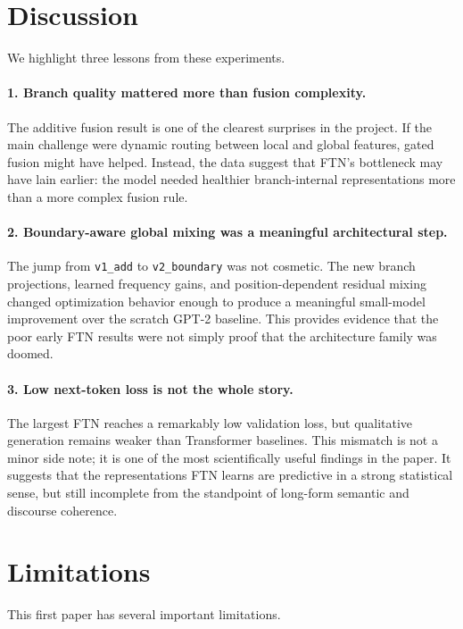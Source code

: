 \documentclass[11pt]{article}
\begin{document}
\section{Discussion}
\label{sec:discussion}
We highlight three lessons from these experiments.

\paragraph{1. Branch quality mattered more than fusion complexity.}
The additive fusion result is one of the clearest surprises in the project. If the main challenge were dynamic routing between local and global features, gated fusion might have helped. Instead, the data suggest that FTN's bottleneck may have lain earlier: the model needed healthier branch-internal representations more than a more complex fusion rule.

\paragraph{2. Boundary-aware global mixing was a meaningful architectural step.}
The jump from \texttt{v1\_add} to \texttt{v2\_boundary} was not cosmetic. The new branch projections, learned frequency gains, and position-dependent residual mixing changed optimization behavior enough to produce a meaningful small-model improvement over the scratch GPT-2 baseline. This provides evidence that the poor early FTN results were not simply proof that the architecture family was doomed.

\paragraph{3. Low next-token loss is not the whole story.}
The largest FTN reaches a remarkably low validation loss, but qualitative generation remains weaker than Transformer baselines. This mismatch is not a minor side note; it is one of the most scientifically useful findings in the paper. It suggests that the representations FTN learns are predictive in a strong statistical sense, but still incomplete from the standpoint of long-form semantic and discourse coherence.

\section{Limitations}
This first paper has several important limitations.
\end{document}
